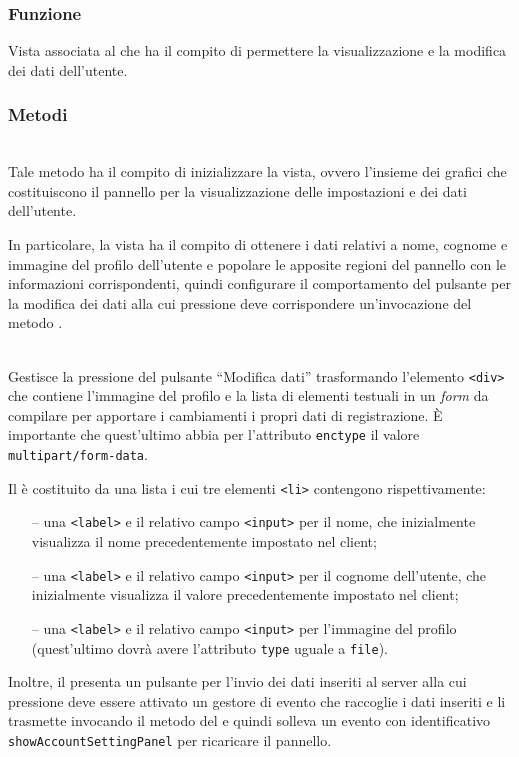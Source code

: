 \subsubsection*{Funzione}
Vista associata al   che ha il compito di permettere la visualizzazione e la modifica dei dati dell'utente.

\subsubsection*{Metodi}
\begin{description}
\item{}\\
Tale metodo ha il compito di inizializzare la vista, ovvero l'insieme dei  grafici che costituiscono il pannello per la visualizzazione delle impostazioni e dei dati dell'utente.

In particolare, la vista ha il compito di ottenere i dati relativi a nome, cognome e immagine del profilo dell'utente e popolare le apposite regioni del pannello con le informazioni corrispondenti, quindi configurare il comportamento del pulsante per la modifica dei dati alla cui pressione deve corrispondere un'invocazione del metodo .

\item{}\\
Gestisce la pressione del pulsante ``Modifica dati'' trasformando l'elemento \verb'<div>' che contiene l'immagine del profilo e la lista di elementi testuali in un \textit{form} da compilare per apportare i cambiamenti i propri dati di registrazione. È importante che quest'ultimo abbia per l'attributo \verb'enctype' il valore \verb'multipart/form-data'.

Il  è costituito da una lista i cui tre elementi \verb'<li>' contengono rispettivamente:
\begin{itemize}
  \item[--] una \verb'<label>' e il relativo campo \verb'<input>' per il nome, che inizialmente visualizza il nome precedentemente impostato nel client;
  \item[--] una \verb'<label>' e il relativo campo \verb'<input>' per il cognome dell'utente, che inizialmente visualizza il valore precedentemente impostato nel client;
  \item[--] una \verb'<label>' e il relativo campo \verb'<input>' per l'immagine del profilo (quest'ultimo dovrà avere l'attributo \verb'type' uguale a \verb'file').
\end{itemize}

Inoltre, il  presenta un pulsante per l'invio dei dati inseriti al server alla cui pressione deve essere attivato un gestore di evento che raccoglie i dati inseriti e li trasmette invocando il metodo  del  e quindi solleva un evento con identificativo \verb'showAccountSettingPanel' per ricaricare il pannello.

\end{description}

